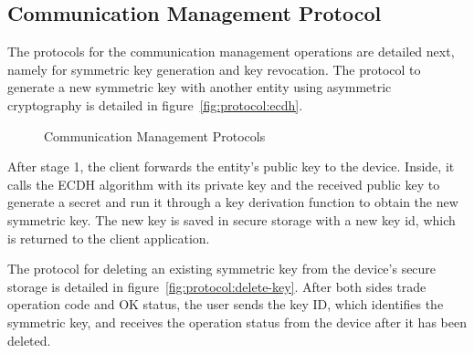 \subsection{Communication Management Protocol}\label{chap:implementation:protocol:key}

The protocols for the communication management operations are detailed next, namely for symmetric key generation and key revocation. 
The protocol to generate a new symmetric key with another entity using asymmetric cryptography is detailed in figure~\ref{fig:protocol:ecdh}.

\begin{figure}[h!]
	\centering     %
	\caption{Communication Management Protocols}
\end{figure}

After stage 1, the client forwards the entity's public key to the device. Inside, it calls the ECDH algorithm with its private key and the received public key to generate a secret and run it through a key derivation function to obtain the new symmetric key.
The new key is saved in secure storage with a new key id, which is returned to the client application.

The protocol for deleting an existing symmetric key from the device's secure storage is detailed in figure~\ref{fig:protocol:delete-key}.
After both sides trade operation code and OK status, the user sends the key ID, which identifies the symmetric key, and receives the operation status from the device after it has been deleted.


